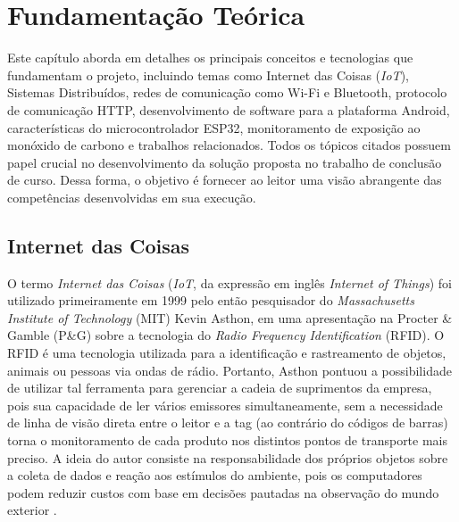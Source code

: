 \chapter{Fundamentação Teórica}

Este capítulo aborda em detalhes os principais conceitos e tecnologias que fundamentam o projeto, incluindo temas como Internet das Coisas (\textit{IoT}), Sistemas Distribuídos, 
redes de comunicação como Wi-Fi e Bluetooth, protocolo de comunicação HTTP, desenvolvimento de software para a plataforma Android, características do microcontrolador ESP32, monitoramento de 
exposição ao monóxido de carbono e trabalhos relacionados. Todos os tópicos citados possuem papel crucial no desenvolvimento da solução proposta no trabalho de conclusão de curso. Dessa forma, o
objetivo é fornecer ao leitor uma visão abrangente das competências desenvolvidas em sua execução.

\section{Internet das Coisas}

O termo \textit{Internet das Coisas} (\textit{IoT}, da expressão em inglês \textit{Internet of Things}) foi utilizado primeiramente em 1999 pelo então pesquisador do \textit{Massachusetts Institute of Technology} (MIT) Kevin Asthon, em 
uma apresentação na Procter \& Gamble (P\&G) sobre a tecnologia do \textit{Radio Frequency Identification} (RFID). O RFID é uma tecnologia utilizada para a identificação e rastreamento de objetos, animais ou pessoas 
via ondas de rádio. Portanto, Asthon pontuou a possibilidade de utilizar tal ferramenta para gerenciar a cadeia de suprimentos da empresa, pois sua capacidade de ler vários emissores simultaneamente, sem a necessidade de linha de visão direta entre o leitor 
e a tag (ao contrário do códigos de barras) torna o monitoramento de cada produto nos distintos pontos de transporte mais preciso. A ideia do autor consiste na responsabilidade dos próprios objetos sobre a coleta de dados
e reação aos estímulos do ambiente, pois os computadores podem reduzir custos com base em decisões pautadas na observação do mundo exterior \cite{iot-first-definition}.

